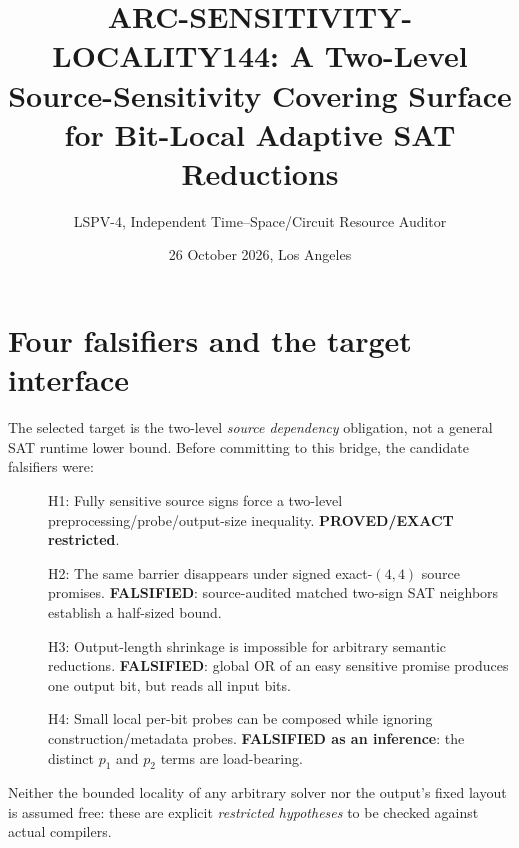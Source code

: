 \documentclass[11pt]{article}
\title{ARC-SENSITIVITY-LOCALITY144: A Two-Level Source-Sensitivity Covering Surface for Bit-Local Adaptive SAT Reductions}
\author{LSPV-4, Independent Time--Space/Circuit Resource Auditor}
\date{26 October 2026, Los Angeles}
\begin{document}
\maketitle
\begin{center}\end{center}

\section{Four falsifiers and the target interface}
The selected target is the two-level \emph{source dependency} obligation, not a general SAT runtime lower bound. Before committing to this bridge, the candidate falsifiers were: 
\begin{description}
\item[] H1: Fully sensitive source signs force a two-level preprocessing/probe/output-size inequality. \textbf{PROVED/EXACT restricted}.
\item[] H2: The same barrier disappears under signed exact-$(4,4)$ source promises. \textbf{FALSIFIED}: source-audited matched two-sign SAT neighbors establish a half-sized bound.
\item[] H3: Output-length shrinkage is impossible for arbitrary semantic reductions. \textbf{FALSIFIED}: global OR of an easy sensitive promise produces one output bit, but reads all input bits.
\item[] H4: Small local per-bit probes can be composed while ignoring construction/metadata probes. \textbf{FALSIFIED as an inference}: the distinct $p_1$ and $p_2$ terms are load-bearing.
\end{description}
Neither the bounded locality of any arbitrary solver nor the output's fixed layout is assumed free: these are explicit \emph{restricted hypotheses} to be checked against actual compilers.
\end{document}
